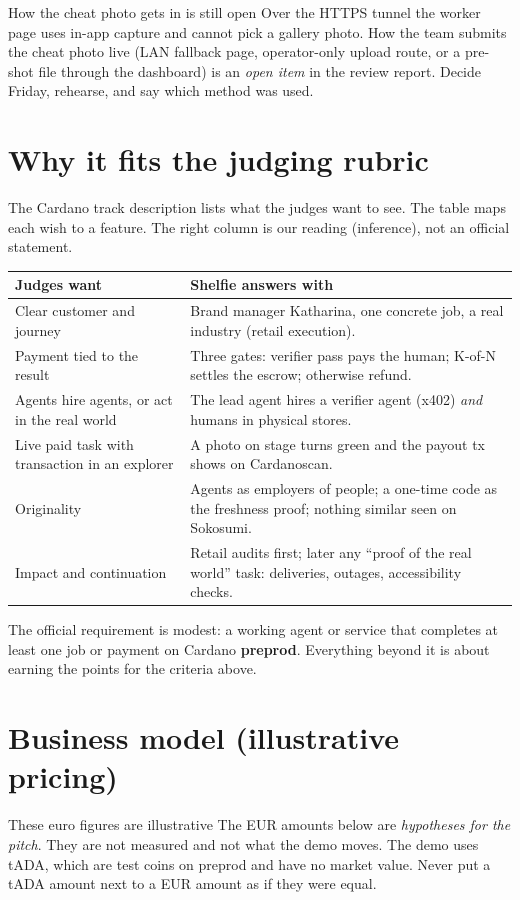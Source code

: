 \begin{warningbox}{How the cheat photo gets in is still open}
Over the HTTPS tunnel the worker page uses in-app capture and cannot pick a gallery photo. How the team submits the cheat photo live (LAN fallback page, operator-only upload route, or a pre-shot file through the dashboard) is an \emph{open item} in the review report. Decide Friday, rehearse, and say which method was used.
\end{warningbox}

\section{Why it fits the judging rubric}
The Cardano track description lists what the judges want to see. The table maps each wish to a feature. The right column is our reading (inference), not an official statement.

\begin{center}
\small
\begin{tabularx}{\textwidth}{@{}p{4.1cm}X@{}}
\toprule
\textbf{Judges want} & \textbf{Shelfie answers with}\\
\midrule
Clear customer and journey & Brand manager Katharina, one concrete job, a real industry (retail execution).\\
Payment tied to the result & Three gates: verifier pass pays the human; K-of-N settles the escrow; otherwise refund.\\
Agents hire agents, or act in the real world & The lead agent hires a verifier agent (x402) \emph{and} humans in physical stores.\\
Live paid task with transaction in an explorer & A photo on stage turns green and the payout tx shows on Cardanoscan.\\
Originality & Agents as employers of people; a one-time code as the freshness proof; nothing similar seen on Sokosumi.\\
Impact and continuation & Retail audits first; later any ``proof of the real world'' task: deliveries, outages, accessibility checks.\\
\bottomrule
\end{tabularx}
\end{center}

The official requirement is modest: a working agent or service that completes at least one job or payment on Cardano \textbf{preprod}. Everything beyond it is about earning the points for the criteria above.

\section{Business model (illustrative pricing)}
\begin{warningbox}{These euro figures are illustrative}
The EUR amounts below are \emph{hypotheses for the pitch}. They are not measured and not what the demo moves. The demo uses tADA, which are test coins on preprod and have no market value. Never put a tADA amount next to a EUR amount as if they were equal.
\end{warningbox}

